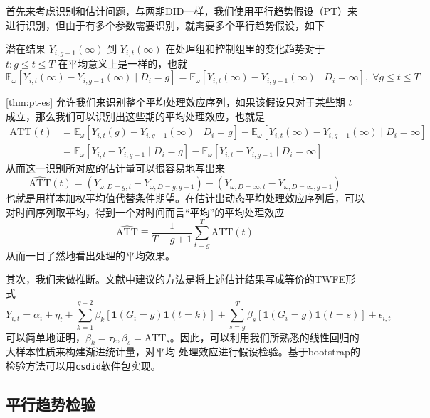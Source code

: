 \documentclass[../didNotes.tex]{subfiles}
\begin{document}
首先来考虑识别和估计问题，与两期DID一样，我们使用平行趋势假设（PT）来进行识别，但由于有多个参数需要识别，就需要多个平行趋势假设，如下
\begin{assumption}[PT-ES]\label{thm:pt-es}
  潜在结果 $Y_{i,g-1}(\infty)$ 到 $Y_{i,t}(\infty)$ 在处理组和控制组里的变化趋势对于 $t:g\le t\le T$ 在平均意义上是一样的，也就
  $$
  \mathbb{E}_{\omega}[Y_{i,t}(\infty) -Y_{i,g-1}(\infty) \mid D_i=g] =
  \mathbb{E}_{\omega}[Y_{i,t}(\infty) - Y_{i,g-1}(\infty) \mid D_i=\infty], \; \forall g \le t \le T
  $$
\end{assumption}
\autoref{thm:pt-es} 允许我们来识别整个平均处理效应序列，如果该假设只对于某些期 $t$ 成立，那么我们可以识别出这些期的平均处理效应，也就是
\begin{align*}
  \text{ATT}(t) &= \mathbb{E}_{\omega}[Y_{i,t}(g)-Y_{i,g-1}(\infty) \mid D_{i}=g] -
  \mathbb{E}_{\omega}[Y_{i,t}(\infty)-Y_{i,g-1}(\infty) \mid D_{i}=\infty] \\
  &= \mathbb{E}_{\omega}[Y_{i,t}-Y_{i,g-1} \mid D_{i}=g] -
  \mathbb{E}_{\omega}[Y_{i,t}-Y_{i,g-1} \mid D_{i}=\infty]
\end{align*}
从而这一识别所对应的估计量可以很容易地写出来
$$
\widehat{\text{ATT}}(t) = (\bar{Y}_{\omega, D=g, t}-\bar{Y}_{\omega, D=g, g-1}) -
(\bar{Y}_{\omega, D=\infty, t}-\bar{Y}_{\omega, D=\infty, g-1})
$$
也就是用样本加权平均值代替条件期望。在估计出动态平均处理效应序列后，可以对时间序列取平均，得到一个对时间而言``平均''的平均处理效应
$$
\widehat{\text{ATT}} \equiv \frac{1}{T-g+1} \sum_{t=g}^{T} \widehat{\text{ATT}}(t)
$$
从而一目了然地看出处理的平均效果。

其次，我们来做推断。文献中建议的方法是将上述估计结果写成等价的TWFE形式
$$
Y_{i,t} = \alpha_i + \eta_t + \sum_{k=1}^{g-2} \beta_k \left[ \mathbf{1}(G_i=g)
\mathbf{1}(t=k) \right] +
\sum_{s=g}^{T} \beta_s  \left[ \mathbf{1}(G_i=g) \mathbf{1}(t=s) \right] + \epsilon_{i,t}
$$
可以简单地证明，$\beta_{k}=\tau_{k},\beta_{s}=\text{ATT}_s$。因此，可以利用我们所熟悉的线性回归的大样本性质来构建渐进统计量，对平均
处理效应进行假设检验。基于bootstrap的检验方法可以用\texttt{csdid}软件包实现。%

\subsection{平行趋势检验}
\end{document}
